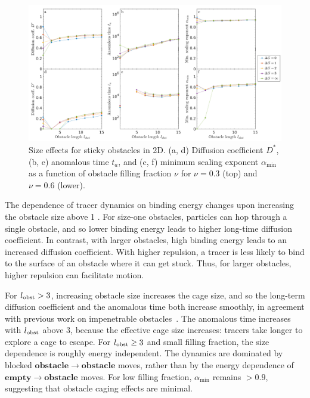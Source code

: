 \begin{figure}[!b]
  \begin{center}
	  \includegraphics[width=150mm]{figs/ch02_soft/soft_size_sticky.png}
  \end{center}
	\caption[Sticky size effects]
    {Size effects for sticky obstacles in 2D.  (a, d) Diffusion
    coefficient $D^*$, (b, e) anomalous time $ t_a $, and (c, f)
    minimum scaling exponent $\alpha_{\min}$ as a function of
    obstacle filling fraction $\nu$ for $\nu=0.3$ (top) and $\nu =0.6$
    (lower).}\label{fig:size_sticky}
\end{figure}

The dependence of tracer dynamics on binding energy changes upon increasing the
obstacle size above 1 .  For size-one obstacles,
particles can hop through a single obstacle, and so lower binding energy leads
to higher long-time diffusion coefficient. In contrast, with larger obstacles,
high binding energy leads to an increased diffusion coefficient. With higher
repulsion, a tracer is less likely to bind to the surface of an obstacle where
it can get stuck. Thus, for larger obstacles, higher repulsion can facilitate
motion.
 
For $l_{\rm obst}>3$, increasing obstacle size increases the cage size, and so
the long-term diffusion coefficient and the anomalous time both increase
smoothly, in agreement with previous work on impenetrable
obstacles~\cite{ellery_characterizing_14}.  The anomalous time increases with
$l_{\rm obst}$ above 3, because the effective cage size increases: tracers take
longer to explore a cage to escape.  For $l_{\rm obst}\geq 3$ and small filling
fraction, the size dependence is roughly energy independent.  The dynamics are
dominated by blocked $ \mathbf {obstacle} \rightarrow \mathbf {obstacle} $
moves, rather than by the energy dependence of $ \mathbf {empty} \rightarrow
\mathbf {obstacle} $ moves.  For low filling fraction, $\alpha_{\min}$ remains
$>0.9$, suggesting that obstacle caging effects are minimal.


